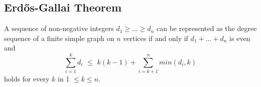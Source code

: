 \subsection{\texorpdfstring{Erd\H{o}s}{}-Gallai Theorem}
A sequence of non-negative integers $d_1 \geq ... \geq d_n$ can be represented as the degree sequence of a finite simple graph on $n$ vertices if and only if $d_1 + ... + d_n$ is even and
$$\sum_{i=1}^{k} d_i \,\, \leq \,\, k(k-1) + \sum_{i=k+1}^{n} min(d_i, k)$$
holds for every $k$ in 1 $\leq k \leq n$.
